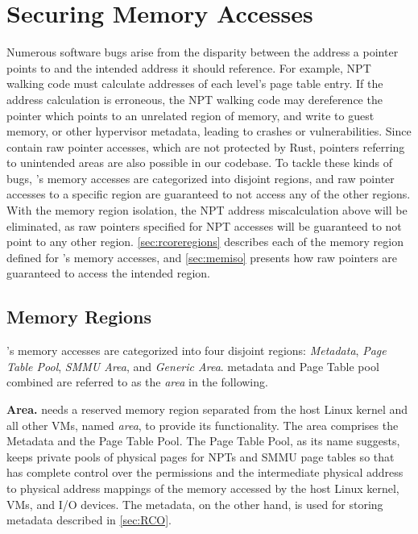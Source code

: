 \chapter{Securing \rustcore{} Memory Accesses}
\label{sec:securercore}

%

%
Numerous software bugs arise from the disparity between the address a pointer
points to and the intended address it should reference.
For example, NPT walking code must calculate addresses of each level's page
table entry. If the address calculation is erroneous, the NPT walking code may
dereference the pointer which points to an unrelated region of memory, and
write to guest memory, or other hypervisor metadata, leading to crashes or
vulnerabilities.
Since \rustcore{} contain raw pointer accesses, which are not protected by
Rust, pointers referring to unintended areas are also possible in our codebase.
To tackle these kinds of bugs, \rustcore{}'s memory accesses are categorized
into disjoint regions, and raw pointer accesses to a specific region are
guaranteed to not access any of the other regions. With the memory region
isolation, the NPT address miscalculation above will be eliminated, as raw
pointers specified for NPT accesses will be guaranteed to not point to any
other region.
\autoref{sec:rcoreregions}
describes each of the memory region defined for \rustcore{}'s memory accesses,
and \autoref{sec:memiso} presents how raw pointers are guaranteed to access the
intended region.

\section{\rustcore{} Memory Regions}
\label{sec:rcoreregions}

\rustcore{}'s memory accesses are categorized into four disjoint regions:
\textit{\rustcore{} Metadata}, \textit{Page Table Pool},
\textit{SMMU Area}, and \textit{Generic Area}.
\rustcore{} metadata and \rustcore{} Page Table pool combined are referred to as
the \textit{\rustcore{} area} in the following.

\textbf{\rustcore{} Area.}
\rustcore{} needs a reserved memory region separated from the host Linux kernel
and all other VMs, named \textit{\rustcore{} area}, to provide its functionality.
The \rustcore{} area comprises the \rustcore{} Metadata and the \rustcore{} Page Table Pool.
The \rustcore{} Page Table Pool, as its name suggests, keeps private pools of physical pages
for NPTs and SMMU page tables so that \rustcore{} has complete control
over the permissions and the intermediate physical address to physical address mappings of the memory
accessed by the host Linux kernel, VMs, and I/O devices. The \rustcore{} metadata,
on the other hand, is used for storing \rustcore{} metadata described in
\autoref{sec:RCO}.

